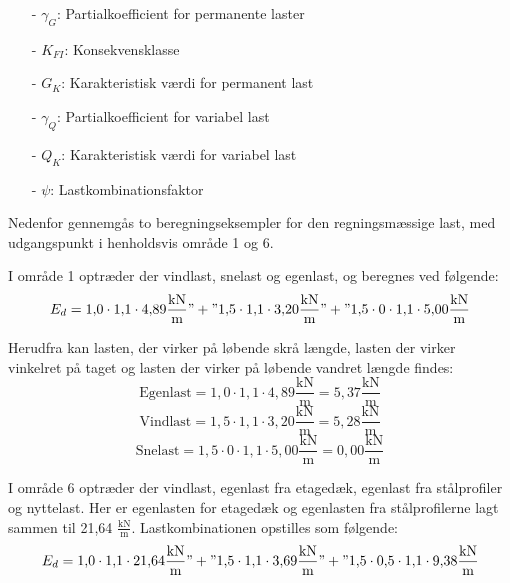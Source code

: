\begin{itemize}
	\item[-] $\gamma_G$: Partialkoefficient for permanente laster
	\item[-] $K_{FI}$: Konsekvensklasse
	\item[-] $G_K$: Karakteristisk værdi for permanent last
	\item[-] $\gamma_Q$: Partialkoefficient for variabel last
	\item[-] $Q_K$: Karakteristisk værdi for variabel last
	\item[-] $\psi$: Lastkombinationsfaktor 
\end{itemize}

Nedenfor gennemgås to beregningseksempler for den regningsmæssige last, med udgangspunkt i henholdsvis område 1 og 6. 

I område 1 optræder der vindlast, snelast og egenlast, og beregnes ved følgende:
\begin{equation}
	E_d = 1,\!0 \cdot 1,\!1 \cdot 4,\!89 \frac{\text{kN}}{\text{m}} "+" 1,\!5 \cdot 1,\!1 \cdot 3,\!20 \frac{\text{kN}}{\text{m}} "+" 1,\!5 \cdot 0 \cdot 1,\!1 \cdot 5,\!00 \frac{\text{kN}}{\text{m}}
\end{equation}

Herudfra kan lasten, der virker på løbende skrå længde, lasten der virker vinkelret på taget og lasten der virker på løbende vandret længde findes:
\begin{equation}
	\text{Egenlast} = 1,\!0 \cdot 1,\!1 \cdot 4,\!89 \frac{\text{kN}}{\text{m}} = 5,\!37 \frac{\text{kN}}{\text{m}}
\end{equation}
\begin{equation}
	\text{Vindlast} = 1,\!5 \cdot 1,\!1 \cdot 3,\!20 \frac{\text{kN}}{\text{m}} = 5,\!28 \frac{\text{kN}}{\text{m}}
\end{equation}
\begin{equation}
	\text{Snelast} = 1,\!5 \cdot 0 \cdot 1,\!1 \cdot 5,\!00 \frac{\text{kN}}{\text{m}} = 0,\!00 \frac{\text{kN}}{\text{m}}
\end{equation}

I område 6 optræder der vindlast, egenlast fra etagedæk, egenlast fra stålprofiler og nyttelast. Her er egenlasten for etagedæk og egenlasten fra stålprofilerne lagt sammen til 21,64 $\frac{\text{kN}}{\text{m}}$. Lastkombinationen opstilles som følgende:
\begin{equation}
	E_d = 1,\!0 \cdot 1,\!1 \cdot 21,\!64 \frac{\text{kN}}{\text{m}}" + "1,\!5 \cdot 1,\!1 \cdot 3,\!69 \frac{\text{kN}}{\text{m}}" + "1,\!5 \cdot 0,\!5 \cdot 1,\!1 \cdot 9,\!38 \frac{\text{kN}}{\text{m}}
\end{equation}

